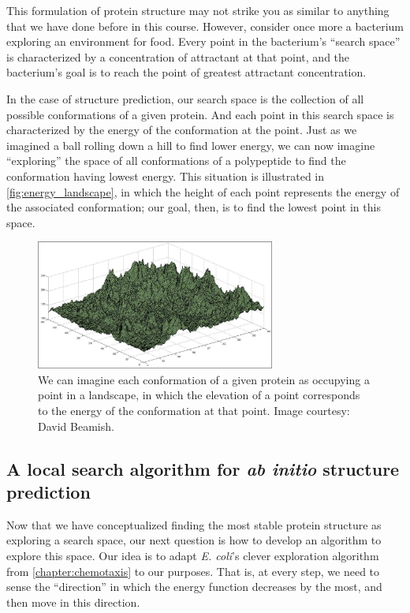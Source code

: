 This formulation of protein structure may not strike you as similar to anything that we have done before in this course. However, consider once more a bacterium exploring an environment for food. Every point in the bacterium's ``search space'' is characterized by a concentration of attractant at that point, and the bacterium's goal is to reach the point of greatest attractant concentration.

In the case of structure prediction, our search space is the collection of all possible conformations of a given protein. And each point in this search space is characterized by the energy of the conformation at the point. Just as we imagined a ball rolling down a hill to find lower energy, we can now imagine ``exploring'' the space of all conformations of a polypeptide to find the conformation having lowest energy. This situation is illustrated in \autoref{fig:energy_landscape}, in which the height of each point represents the energy of the associated conformation; our goal, then, is to find the lowest point in this space.\\

\begin{figure}[h]
	\centering
	\mySfFamily
	\includegraphics[width = 0.7\textwidth]{../images/energy_landscape.png}
	\caption{We can imagine each conformation of a given protein as occupying a point in a landscape, in which the elevation of a point corresponds to the energy of the conformation at that point. Image courtesy: David Beamish.}
	\label{fig:energy_landscape}
\end{figure}

\FloatBarrier
{}
\subsection{A local search algorithm for \textit{ab initio} structure prediction}

Now that we have conceptualized finding the most stable protein structure as exploring a search space, our next question is how to develop an algorithm to explore this space. Our idea is to adapt \textit{E. coli}'s clever exploration algorithm from \autoref{chapter:chemotaxis} to our purposes. That is, at every step, we need to sense the ``direction'' in which the energy function decreases by the most, and then move in this direction.

